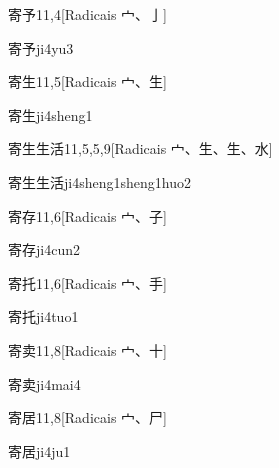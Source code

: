 \begin{entry}{寄予}{11,4}[Radicais ⼧、⼅]
  \begin{phonetics}{寄予}{ji4yu3}
  \end{phonetics}
\end{entry}

\begin{entry}{寄生}{11,5}[Radicais ⼧、⽣]
  \begin{phonetics}{寄生}{ji4sheng1}
  \end{phonetics}
\end{entry}

\begin{entry}{寄生生活}{11,5,5,9}[Radicais ⼧、⽣、⽣、⽔]
  \begin{phonetics}{寄生生活}{ji4sheng1sheng1huo2}
  \end{phonetics}
\end{entry}

\begin{entry}{寄存}{11,6}[Radicais ⼧、⼦]
  \begin{phonetics}{寄存}{ji4cun2}
  \end{phonetics}
\end{entry}

\begin{entry}{寄托}{11,6}[Radicais ⼧、⼿]
  \begin{phonetics}{寄托}{ji4tuo1}
  \end{phonetics}
\end{entry}

\begin{entry}{寄卖}{11,8}[Radicais ⼧、⼗]
  \begin{phonetics}{寄卖}{ji4mai4}
  \end{phonetics}
\end{entry}

\begin{entry}{寄居}{11,8}[Radicais ⼧、⼫]
  \begin{phonetics}{寄居}{ji4ju1}
  \end{phonetics}
\end{entry}

